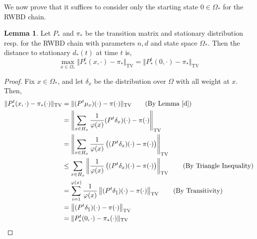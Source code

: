 \documentclass{article}
\theoremstyle{definition}
\theoremstyle{definition}
\theoremstyle{definition}
\newtheorem{lemma}{Lemma}
\theoremstyle{definition}
\theoremstyle{named}
\begin{document}
\noindent We now prove that it suffices to consider only the starting state $0 \in \Omega_*$ for the RWBD chain.
\begin{lemma}
   \label{dd}
   Let $P_*$ and $\pi_*$ be the transition matrix and stationary distribution resp. for the RWBD chain with parameters $n,d$ and state space $\Omega_*$. Then the distance to stationary $d_*(t)$ at time $t$ is,
   \[\max_{x\in \Omega_*}\Vert P^t_*(x,\cdot) - \pi_*  \Vert_\text{TV} = \Vert P^t_*(0,\cdot) - \pi_*\Vert_\text{TV} \]
   \begin{proof}
      Fix $x\in \Omega_*$, and let $\delta_x$ be the distribution over $\Omega$ with all weight at $x$. Then,
      \begin{align*}
  \Vert P_*^t(x,\cdot) - \pi_*(\cdot) \Vert_\text{TV} &= \Vert (P^t \mu_x)(\cdot) - \pi(\cdot) \Vert_\text{TV}\tag{By Lemma \ref{d}}\\
   &= \left\Vert \sum_{x\in H_x}\frac{1}{\varphi(x)}(P^t\delta_x)(\cdot) - \pi(\cdot) \right\Vert_\text{TV}\\
   &= \left\Vert \sum_{x\in H_x}\frac{1}{\varphi(x)}\left((P^t\delta_x)(\cdot) - \pi(\cdot)\right) \right\Vert_\text{TV}\\
   &\leq \sum_{x\in H_x}\left\Vert\frac{1}{\varphi(x)} \left((P^t\delta_x)(\cdot) - \pi(\cdot)\right) \right\Vert_\text{TV}\tag{By Triangle Inequality}\\
   &= \sum_{i=1}^{\varphi(x)}\frac{1}{\varphi(x)}\left\Vert (P^t\delta_{\hat{1}})(\cdot) - \pi(\cdot) \right\Vert_\text{TV}\tag{By Transitivity}\\
   &= \left\Vert (P^t\delta_{\hat{1}})(\cdot) - \pi(\cdot) \right\Vert_\text{TV}\\
   &= \Vert P_*^t(0,\cdot) - \pi_*(\cdot) \Vert_\text{TV}
      \end{align*}
      
   \end{proof}
\end{lemma}
\end{document}
